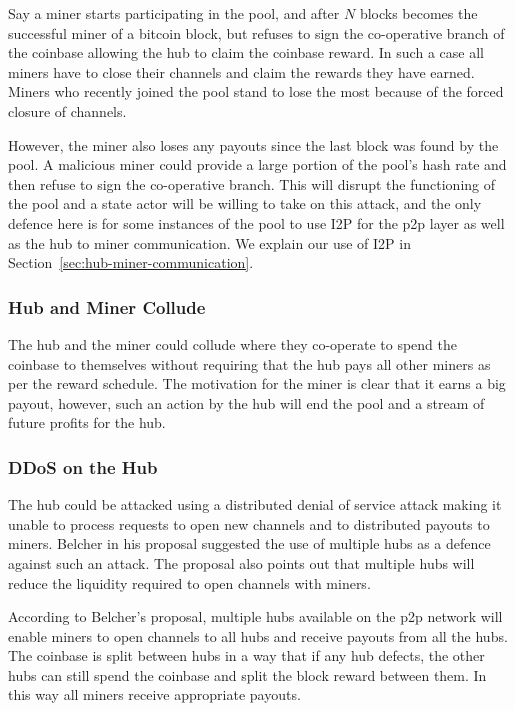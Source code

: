 \documentclass{article}
\begin{document}
Say a miner starts participating in the pool, and after $N$ blocks
becomes the successful miner of a bitcoin block, but refuses to sign
the co-operative branch of the coinbase allowing the hub to claim the
coinbase reward. In such a case all miners have to close their
channels and claim the rewards they have earned. Miners who recently
joined the pool stand to lose the most because of the forced closure
of channels.

However, the miner also loses any payouts since the last block was
found by the pool. A malicious miner could provide a large portion of
the pool's hash rate and then refuse to sign the co-operative
branch. This will disrupt the functioning of the pool and a state
actor will be willing to take on this attack, and the only defence
here is for some instances of the pool to use I2P for the p2p layer as
well as the hub to miner communication. We explain our use of I2P in
Section~\ref{sec:hub-miner-communication}.

\subsubsection{Hub and Miner Collude}\label{ref:collusion}

The hub and the miner could collude where they co-operate to spend the
coinbase to themselves without requiring that the hub pays all other
miners as per the reward schedule. The motivation for the miner is
clear that it earns a big payout, however, such an action by the hub
will end the pool and a stream of future profits for the hub.


\subsubsection{DDoS on the Hub}\label{ref:ddos-attack}

The hub could be attacked using a distributed denial of service attack
making it unable to process requests to open new channels and to
distributed payouts to miners. Belcher in his proposal suggested the
use of multiple hubs as a defence against such an attack. The proposal
also points out that multiple hubs will reduce the liquidity required
to open channels with miners.

According to Belcher's proposal, multiple hubs available on the p2p
network will enable miners to open channels to all hubs and receive
payouts from all the hubs. The coinbase is split between hubs in a way
that if any hub defects, the other hubs can still spend the coinbase
and split the block reward between them. In this way all miners
receive appropriate payouts.
\end{document}

